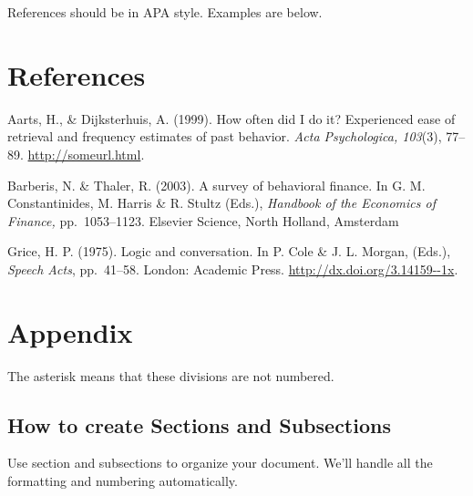 \documentclass[twocolumn]{article}
\begin{document}
References should be in APA style. Examples are below.


\section*{References}

\begin{hangparas}{1em}{1}

  Aarts, H., \& Dijksterhuis, A. (1999).  How often did I do it?
  Experienced ease of retrieval and frequency estimates of past
  behavior.  \textit{Acta Psychologica, 103}(3), 77--89. \url{http://someurl.html}.

  Barberis, N. \& Thaler, R. (2003). A survey of behavioral finance.
  In G. M. Constantinides, M. Harris \& R. Stultz (Eds.),
  \textit{Handbook of the Economics of Finance,} pp.\ 1053--1123.
  Elsevier Science, North Holland, Amsterdam

Grice, H. P. (1975).  Logic and conversation. In P. Cole \& J.
L. Morgan, (Eds.), \textit{Speech Acts}, pp.\ 41--58. London: Academic
Press. \url{http://dx.doi.org/3.14159--1x}.
\end{hangparas}

\bigskip

\section*{Appendix}

The asterisk means that these divisions are not numbered.

\subsection*{How to create Sections and Subsections}

Use section and subsections to organize your document. We'll handle all the formatting and numbering automatically.
\end{document}
